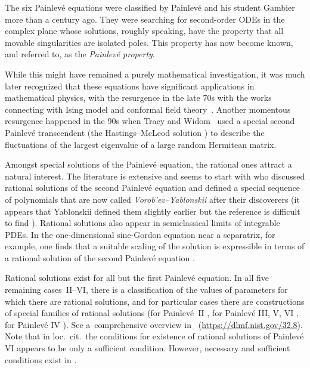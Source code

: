 \documentclass[pdftex]{sigma}
\numberwithin{equation}{section}
\theoremstyle{definition}
\begin{document}
The six Painlev\'e equations were classified by Painlev\'e and his student Gambier \cite{Gambier,Painleve} more than a century ago. They were searching for second-order ODEs in the complex plane whose solutions, roughly speaking, have the property that all movable singularities are isolated poles. This property has now become known, and referred to, as the {\it Painlev\'e property}.

While this might have remained a purely mathematical investigation, it was much later recognized that these equations have significant applications in mathematical physics, with the resurgence in the late 70s with the works connecting with Ising model and conformal field theory~\cite{McCoyTracyWu1, McCoyTracyWu2}. Another momentous resurgence happened in the 90s when Tracy and Widom~\cite{TracyWidom94} used a special second Painlev\'e transcendent (the Hastings--McLeod solution \cite{HasMc}) to describe the fluctuations of the largest eigenvalue of a large random Hermitean matrix.

Amongst special solutions of the Painlev\'e equation, the rational ones attract a natural interest. The literature is extensive and seems to start with \cite{Vorobev} who discussed rational solutions of the second Painlev\'e equation and defined a special sequence of polynomials that are now called {\it Vorob'ev--Yablonskii} after their discoverers (it appears that Yablonskii defined them slightly earlier but the reference is difficult to find \cite{Yablonskii}).
Rational solutions also appear in semiclassical limits of integrable PDEs. In the one-dimensional sine-Gordon equation near a separatrix, for example, one finds that a suitable scaling of the solution is expressible in terms of a rational solution of the second Painlev\'e equation \cite{BuckMill12}.

Rational solutions exist for all but the first Painlev\'e equation. In all five remaining cases~II--VI, there is a classification of the values of parameters for which there are rational solutions, and for particular cases there are constructions of special families of rational solutions (for Painlev\'e~II \cite{KajiwaraOhta,Vorobev, Yablonskii}, for Painlev\'e III, V, VI \cite{Masuda,MR1942391, MR1650509, Okamoto2,Okamoto3, Umemura1}, for Painlev\'e IV \cite{Okamoto1}). See a~comprehensive overview in~\cite{DLMF} (\href{https://dlmf.nist.gov/32.8}{https://dlmf.nist.gov/32.8}). Note that in loc.\ cit.\ the conditions for existence of rational solutions of Painlev\'e VI appears to be only a sufficient condition. However, necessary and sufficient conditions exist in \cite{Marta}.
\end{document}

